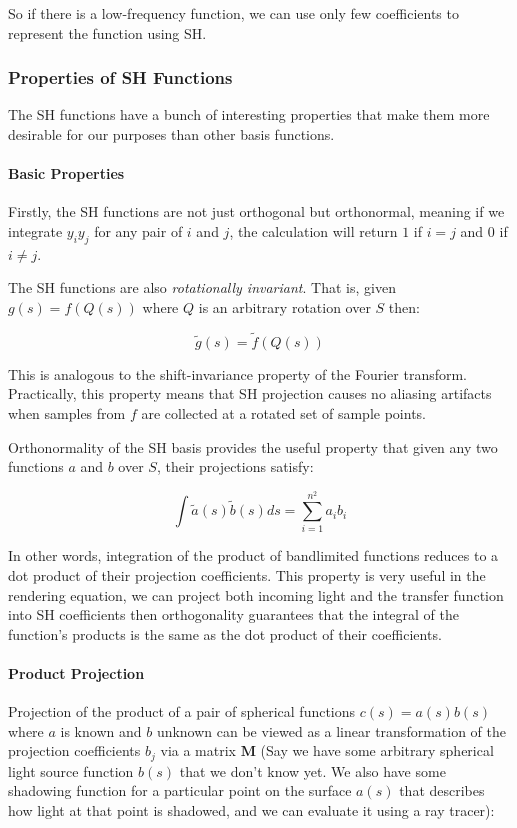 So if there is a low-frequency function, we can use only few coefficients to represent the function using SH.



\subsubsection{Properties of SH Functions}
The SH functions have a bunch of interesting properties that make them more desirable for our purposes than other basis functions.

\paragraph{Basic Properties} Firstly, the SH functions are not just orthogonal but orthonormal, meaning if we integrate $y_iy_j$ for any pair of $i$ and $j$, the calculation will return $1$ if $i=j$ and $0$ if $i\neq j$.


The SH functions are also \textit{rotationally invariant}. That is, given $g(s)=f(Q(s))$ where $Q$ is an arbitrary rotation over $S$ then:

\begin{equation*}
	\tilde{g}(s)=\tilde{f}(Q(s))
\end{equation*}

This is analogous to the shift-invariance property of the Fourier transform. Practically, this property means that SH projection causes no aliasing artifacts when samples from $f$ are collected at a rotated set of sample points.

Orthonormality of the SH basis provides the useful property that given any two functions $a$ and $b$ over $S$, their projections satisfy:

\begin{equation*}
	\int \tilde{a}(s)\tilde{b}(s)ds=\sum^{n^{2}}_{i=1}a_ib_i
\end{equation*}

In other words, integration of the product of bandlimited functions reduces to a dot product of their projection coefficients. This property is very useful in the rendering equation, we can project both incoming light and the transfer function into SH coefficients then orthogonality guarantees that the integral of the function's products is the same as the dot product of their coefficients.


\paragraph{Product Projection} Projection of the product of a pair of spherical functions $c(s)=a(s)b(s)$ where $a$ is known and $b$ unknown can be viewed as a linear transformation of the projection coefficients $b_j$ via a matrix $\mathbf{M}$ (Say we have some arbitrary spherical light source function $b(s)$ that we don't know yet. We also have some shadowing function for a particular point on the surface $a(s)$ that describes how light at that point is shadowed, and we can evaluate it using a ray tracer):

